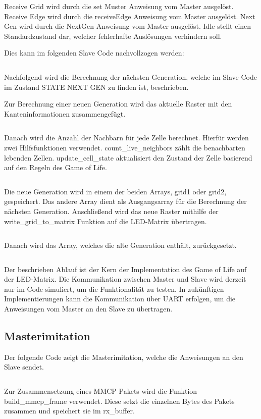 Receive Grid wird durch die set Muster Anweisung vom Master ausgelöst. Receive
Edge wird durch die receiveEdge Anweisung vom Master ausgelöst. Next Gen wird
durch die NextGen Anweisung vom Master ausgelöst. Idle stellt einen
Standardzustand dar, welcher fehlerhafte Auslösungen verhindern soll.

Dies kann im folgenden Slave Code nachvollzogen werden:
\inputminted[linenos,fontsize=\footnotesize, firstline=364,
  lastline=452]{c}{A10_Abgabe/iceduino_setup_gol/sw/lib/source/game_of_life.c}

Nachfolgend wird die Berechnung der nächsten Generation, welche 
im Slave Code im Zustand STATE NEXT GEN zu finden ist, beschrieben.

Zur Berechnung einer neuen Generation wird das aktuelle Raster mit den
Kanteninformationen zusammengefügt.
\inputminted[linenos,fontsize=\footnotesize, firstline=289,
  lastline=337]{c}{A10_Abgabe/iceduino_setup_gol/sw/lib/source/game_of_life.c}
Danach wird die Anzahl der Nachbarn für jede Zelle berechnet. Hierfür werden
zwei Hilfsfunktionen verwendet. count\_live\_neighbors zählt die benachbarten
lebenden Zellen. update\_cell\_state aktualisiert den Zustand der Zelle
basierend auf den Regeln des Game of Life.
\inputminted[linenos,fontsize=\footnotesize, firstline=220,
  lastline=286]{c}{A10_Abgabe/iceduino_setup_gol/sw/lib/source/game_of_life.c}

Die neue Generation wird in einem der beiden Arrays, grid1 oder grid2,
gespeichert. Das andere Array dient als Ausgangsarray für die Berechnung der
nächsten Generation. Anschließend wird das neue Raster mithilfe der
write\_grid\_to\_matrix Funktion auf die LED-Matrix übertragen.
\inputminted[linenos,fontsize=\footnotesize, firstline=161,
  lastline=176]{c}{A10_Abgabe/iceduino_setup_gol/sw/lib/source/game_of_life.c}

Danach wird das Array, welches die alte Generation enthält, zurückgesetzt.
\inputminted[linenos,fontsize=\footnotesize, firstline=187,
  lastline=192]{c}{A10_Abgabe/iceduino_setup_gol/sw/lib/source/game_of_life.c}

Der beschrieben Ablauf ist der Kern der Implementation des Game of Life auf der
LED-Matrix. Die Kommunikation zwischen Master und Slave wird derzeit nur im
Code simuliert, um die Funktionalität zu testen. In zukünftigen
Implementierungen kann die Kommunikation über UART erfolgen, um die Anweisungen
vom Master an den Slave zu übertragen.

\subsection{Masterimitation}
Der folgende Code zeigt die Masterimitation, welche die Anweisungen an den
Slave sendet.
\inputminted[linenos,fontsize=\footnotesize,
  firstline=456,
  lastline=503]{c}{A10_Abgabe/iceduino_setup_gol/sw/lib/source/game_of_life.c}
Zur Zusammensetzung eines MMCP Pakets wird die Funktion build\_mmcp\_frame
verwendet. Diese setzt die einzelnen Bytes des Pakets zusammen und speichert
sie im rx\_buffer. \inputminted[linenos,fontsize=\footnotesize,
  firstline=342,
  lastline=362]{c}{A10_Abgabe/iceduino_setup_gol/sw/lib/source/game_of_life.c}


